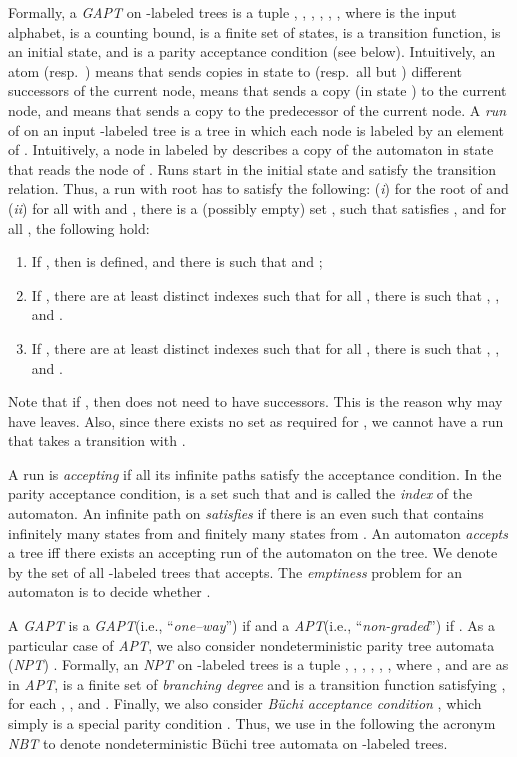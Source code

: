 \documentclass{LMCS}
\theoremstyle{plain}
\def \GAPT          {\emph{GAPT}\xspace}
\def \NBT           {\emph{NBT}\xspace}
\def \NPT           {\emph{NPT}\xspace}
\def \TAPT          {\emph{APT}\xspace}
\def \TGAPT         {\emph{GAPT}\xspace}
\begin{document}
Formally, a \TGAPT on -labeled trees is a tuple ,
, , , , , where  is the input alphabet,
 is a counting bound,  is a finite set of states,  is a transition function, 
is an initial state, and  is a parity acceptance condition (see below).
Intuitively, an atom  (resp.\ ) means that  sends
copies in state  to  (resp.\ all but ) different successors of the
current node,  means that  sends a copy (in state ) to
the current node, and  means that  sends a copy to the predecessor
of the current node. A \emph{run} of  on an input -labeled tree
 is a tree  in which each node is labeled by an element
of . Intuitively, a node in  labeled by  describes a
copy of the automaton in state  that reads the node  of . Runs start
in the initial state and satisfy the transition relation. Thus, a run
 with root  has to satisfy the following: (\emph{i})  for the root  of  and (\emph{ii}) for all  with
 and , there is a (possibly empty) set
, such that  satisfies , and for all , the following hold:

\begin{enumerate}[]
    \item
    If , then  is defined, and there is  such that  and ;

    \item
    If , there are at least  distinct indexes  such that for all , there is  such
    that , , and .

    \item
    If , there are at least  distinct indexes  such that for all , there is  such that , , and .
\end{enumerate}

Note that if , then  does not need to
have successors. This is the reason why  may have leaves.
Also, since there exists no set  as required for , we cannot have a run that takes a transition with
.

A run  is \emph{accepting} if all its infinite paths
satisfy the acceptance condition. In the parity acceptance
condition,  is a set  such that  and  is called the
\emph{index} of the automaton. An infinite path  on 
\emph{satisfies}  if there is an even  such that 
contains infinitely many states from  and finitely many
states from . An automaton \emph{accepts} a tree iff
there exists an accepting run of the automaton on the tree. We
denote by  the set of all -labeled trees that 
accepts. The \emph{emptiness} problem for an automaton  is to
decide whether .

A \TGAPT is a \GAPT (i.e., ``\emph{one--way}'') if 
and a \TAPT (i.e., ``\emph{non-graded}'')  if . As a particular case of \TAPT, we also consider
nondeterministic parity tree automata (\NPT) \cite{KVW00}.
Formally, an \NPT on -labeled trees is a tuple , , , , , , where
, and  are as in \TAPT,  is a finite set of
\emph{branching degree} and  is a transition function satisfying
, for each , , and . Finally, we also consider
\emph{B\"uchi acceptance condition} , which simply
is a special parity condition . Thus, we use
in the following the acronym \NBT to denote nondeterministic
B\"uchi tree automata on -labeled trees.
\end{document}
